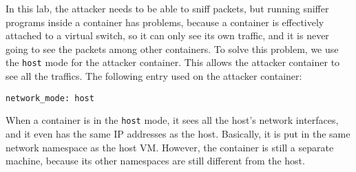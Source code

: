 In this lab, the attacker needs to be able to sniff packets,
but running sniffer programs inside a container has problems, because
a container is effectively attached to a virtual switch, 
so it can only see its own traffic, and it is never going to see 
the packets among other containers. To solve this problem,
we use the \texttt{host} mode for the attacker container. This
allows the attacker container to see all the traffics. The following
entry used on the attacker container:

\begin{lstlisting}
network_mode: host
\end{lstlisting}

When a container is in the \texttt{host} mode,  it sees
all the host's network interfaces, and it even has the same
IP addresses as the host. Basically, it is put in the
same network namespace as the host VM. However, the container
is still a separate machine, because its other namespaces are
still different from the host.

